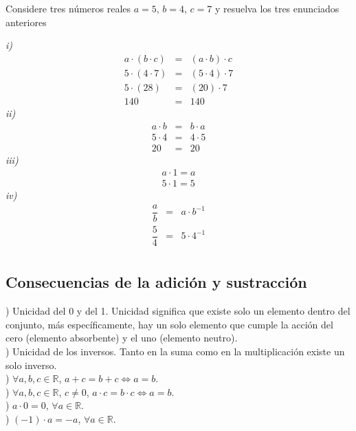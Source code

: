 \begin{myexample}
Considere tres números reales $a=5$, $b=4$, $c=7$ y resuelva los tres enunciados anteriores
\end{myexample}
\noindent\textit{i)}
\begin{eqnarray*}
a\cdot(b\cdot c)&=&(a\cdot b)\cdot c \\
5\cdot(4\cdot 7)&=&(5\cdot 4)\cdot 7 \\
5\cdot(28)&=&(20)\cdot 7 \\
140&=&140
\end{eqnarray*}
\noindent\textit{ii)}
\begin{eqnarray*}
a\cdot b&=&b\cdot a\\
5\cdot 4&=&4\cdot 5\\
20&=&20
\end{eqnarray*}
\noindent\textit{iii)}
\begin{eqnarray*}
a\cdot 1=a\\
5\cdot 1=5
\end{eqnarray*}
\noindent\textit{iv)}
\begin{eqnarray*}
\dfrac{a}{b}&=&a\cdot b^{-1}\\
\dfrac{5}{4}&=&5\cdot 4^{-1}\\
\end{eqnarray*}
\subsection{Consecuencias de la adición y sustracción}
\label{consecu}
) Unicidad del 0 y del 1. Unicidad significa que existe solo un elemento dentro del conjunto, más específicamente, hay un solo elemento que cumple la acción del cero (elemento absorbente) y el uno (elemento neutro). \\

) Unicidad de los inversos. Tanto en la suma como en la multiplicación existe un solo inverso.\\

) $\forall a,b,c\in\mathbb{R}$, $a+c=b+c\Leftrightarrow a=b$. \\

) $\forall a,b,c\in\mathbb{R}$, $c\neq 0$, $a\cdot c=b\cdot c\Leftrightarrow a=b$. \\

) $a\cdot 0=0$, $\forall a\in\mathbb{R}$. \\

) $(-1)\cdot a=-a$, $\forall a\in\mathbb{R}$. \\

